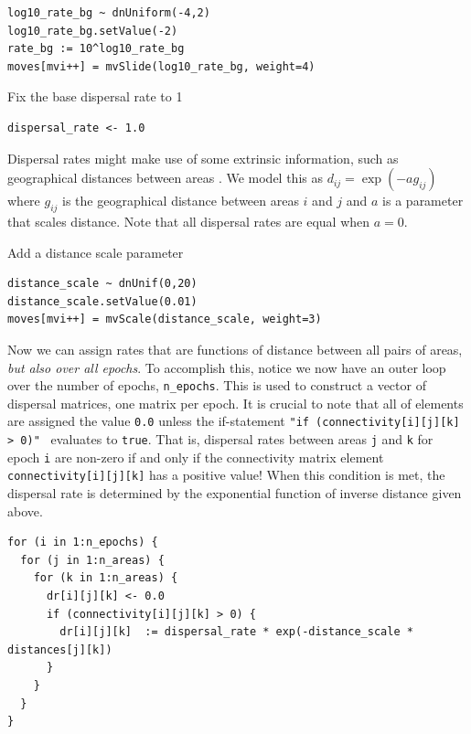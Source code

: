 \begin{snugshade}
\begin{lstlisting}
log10_rate_bg ~ dnUniform(-4,2)
log10_rate_bg.setValue(-2)
rate_bg := 10^log10_rate_bg
moves[mvi++] = mvSlide(log10_rate_bg, weight=4)
\end{lstlisting}
\end{snugshade}


Fix the base dispersal rate to 1

\begin{snugshade}
\begin{lstlisting}
dispersal_rate <- 1.0
\end{lstlisting}
\end{snugshade}

Dispersal rates might make use of some extrinsic information, such as geographical distances between areas \citep{MacArthur1967, Webb2012}.
We model this as $d_{ij} = \exp(-a g_{ij})$ where $g_{ij}$ is the geographical distance between areas $i$ and $j$ and $a$ is a parameter that scales distance.
Note that all dispersal rates are equal when $a=0$.

Add a distance scale parameter

\begin{snugshade}
\begin{lstlisting}
distance_scale ~ dnUnif(0,20)
distance_scale.setValue(0.01)
moves[mvi++] = mvScale(distance_scale, weight=3)
\end{lstlisting}
\end{snugshade}

Now we can assign rates that are functions of distance between all pairs of areas, {\it but also over all epochs}.
To accomplish this, notice we now have an outer loop over the number of epochs, {\tt n\_epochs}.
This is used to construct a vector of dispersal matrices, one matrix per epoch.
It is crucial to note that all of elements are assigned the value {\tt 0.0} unless the if-statement {\tt "if (connectivity[i][j][k] > 0)" } evaluates to {\tt true}.
That is, dispersal rates between areas {\tt j} and {\tt k} for epoch {\tt i} are non-zero if and only if the connectivity matrix element {\tt connectivity[i][j][k]} has a positive value!
When this condition is met, the dispersal rate is determined by the exponential function of inverse distance given above.


\begin{snugshade}
\begin{lstlisting}
for (i in 1:n_epochs) {
  for (j in 1:n_areas) {
    for (k in 1:n_areas) {
      dr[i][j][k] <- 0.0
      if (connectivity[i][j][k] > 0) {
        dr[i][j][k]  := dispersal_rate * exp(-distance_scale * distances[j][k])
      }
    }
  }
}
\end{lstlisting}
\end{snugshade}


